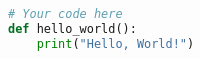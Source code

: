 \documentclass{article}
\begin{document}
\begin{lstlisting}[language=Python]
# Your code here
def hello_world():
    print("Hello, World!")
\end{lstlisting}
\end{document}
